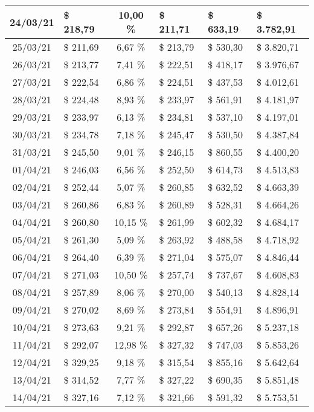 \begin{center}
\begin{small}
\begin{longtable}{|c|l|c|l|l|l|}
24/03/21 & \$ 218,79 & 10,00 \% & \$ 211,71 & \$ 633,19 & \$ 3.782,91 \\ \hline
25/03/21 & \$ 211,69 & 6,67 \% & \$ 213,79 & \$ 530,30 & \$ 3.820,71 \\ \hline
26/03/21 & \$ 213,77 & 7,41 \% & \$ 222,51 & \$ 418,17 & \$ 3.976,67 \\ \hline
27/03/21 & \$ 222,54 & 6,86 \% & \$ 224,51 & \$ 437,53 & \$ 4.012,61 \\ \hline
28/03/21 & \$ 224,48 & 8,93 \% & \$ 233,97 & \$ 561,91 & \$ 4.181,97 \\ \hline
29/03/21 & \$ 233,97 & 6,13 \% & \$ 234,81 & \$ 537,10 & \$ 4.197,01 \\ \hline
30/03/21 & \$ 234,78 & 7,18 \% & \$ 245,47 & \$ 530,50 & \$ 4.387,84 \\ \hline
31/03/21 & \$ 245,50 & 9,01 \% & \$ 246,15 & \$ 860,55 & \$ 4.400,20 \\ \hline
01/04/21 & \$ 246,03 & 6,56 \% & \$ 252,50 & \$ 614,73 & \$ 4.513,83 \\ \hline
02/04/21 & \$ 252,44 & 5,07 \% & \$ 260,85 & \$ 632,52 & \$ 4.663,39 \\ \hline
03/04/21 & \$ 260,86 & 6,83 \% & \$ 260,89 & \$ 528,31 & \$ 4.664,26 \\ \hline
04/04/21 & \$ 260,80 & 10,15 \% & \$ 261,99 & \$ 602,32 & \$ 4.684,17 \\ \hline
05/04/21 & \$ 261,30 & 5,09 \% & \$ 263,92 & \$ 488,58 & \$ 4.718,92 \\ \hline
06/04/21 & \$ 264,40 & 6,39 \% & \$ 271,04 & \$ 575,07 & \$ 4.846,44 \\ \hline
07/04/21 & \$ 271,03 & 10,50 \% & \$ 257,74 & \$ 737,67 & \$ 4.608,83 \\ \hline
08/04/21 & \$ 257,89 & 8,06 \% & \$ 270,00 & \$ 540,13 & \$ 4.828,14 \\ \hline
09/04/21 & \$ 270,02 & 8,69 \% & \$ 273,84 & \$ 554,91 & \$ 4.896,91 \\ \hline
10/04/21 & \$ 273,63 & 9,21 \% & \$ 292,87 & \$ 657,26 & \$ 5.237,18 \\ \hline
11/04/21 & \$ 292,07 & 12,98 \% & \$ 327,32 & \$ 747,03 & \$ 5.853,26 \\ \hline
12/04/21 & \$ 329,25 & 9,18 \% & \$ 315,54 & \$ 855,16 & \$ 5.642,64 \\ \hline
13/04/21 & \$ 314,52 & 7,77 \% & \$ 327,22 & \$ 690,35 & \$ 5.851,48 \\ \hline
14/04/21 & \$ 327,16 & 7,12 \% & \$ 321,66 & \$ 591,32 & \$ 5.753,51 \\ \hline

\end{longtable}
\end{small}
\end{center}
